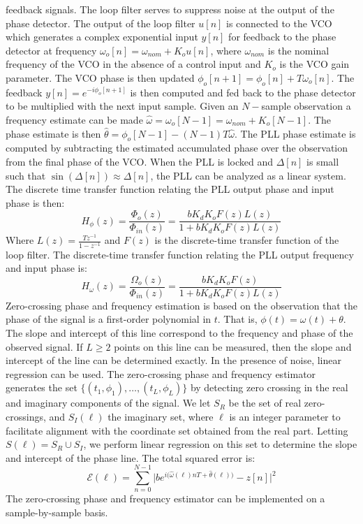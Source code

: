 \documentclass{article}
\theoremstyle{mystyle}
\begin{document}
feedback signals. The loop filter serves to suppress noise at the output of the phase detector. The output of the loop filter $u[n]$ is connected to the VCO which generates a complex exponential input $y[n]$ for feedback to the phase detector at frequency $\omega_{o}[n] = \omega_{nom}+K_{o}u[n]$, where $\omega_{nom}$ is the nominal frequency of the VCO in the absence of a control input and $K_{o}$ is the VCO gain parameter. The VCO phase is then updated $\phi_{o}[n+1] = \phi_{o}[n]+T\omega_{o}[n]$. The feedback $y[n] = e^{-i\phi_{o}[n+1]}$ is then computed and fed back to the phase detector to be multiplied with the next input sample. Given an $N-$sample observation a frequency estimate can be made $\hat{\omega} = \omega_{o}[N-1] = \omega_{nom}+K_{o}[N-1]$. The phase estimate is then $\hat{\theta}=\phi_{o}[N-1]-(N-1)T\hat{\omega}$. The PLL phase estimate is computed by subtracting the estimated accumulated phase over the observation from the final phase of the VCO. When the PLL is locked and $\Delta[n]$ is small such that $\sin(\Delta[n]) \approx \Delta[n]$, the PLL can be analyzed as a linear system. The discrete time transfer function relating the PLL output phase and input phase is then:
\begin{equation}
H_{\phi}(z) = \frac{\Phi_{o}(z)}{\Phi_{in}(z)} = \frac{bK_{d}K_{o}F(z)L(z)}{1+bK_{d}K_{o}F(z)L(z)}
\end{equation}
Where $L(z) = \frac{Tz^{-1}}{1-z^{-1}}$ and $F(z)$ is the discrete-time transfer function of the loop filter. The discrete-time transfer function relating the PLL output frequency and input phase is:
\begin{equation}
H_{\omega}(z) = \frac{\Omega_{o}(z)}{\Phi_{in}(z)} = \frac{bK_{d}K_{o}F(z)}{1+bK_{d}K_{o}F(z)L(z)}
\end{equation}
Zero-crossing phase and frequency estimation is based on the observation that the phase of the signal is a first-order polynomial in $t$. That is, $\phi(t) = \omega(t)+\theta$. The slope and intercept of this line correspond to the frequency and phase of the observed signal. If $L\geq 2$ points on this line can be measured, then the slope and intercept of the line can be determined exactly. In the presence of noise, linear regression can be used. The zero-crossing phase and frequency estimator generates the set $\{(t_1,\phi_1),\hdots, (t_{L},\phi_{L})\}$ by detecting zero crossing in the real and imaginary components of the signal. We let $S_{R}$ be the set of real zero-crossings, and $S_{I}(\ell)$ the imaginary set, where $\ell$ is an integer parameter to facilitate alignment with the coordinate set obtained from the real part. Letting $S(\ell) = S_{R}\cup S_{I}$, we perform linear regression on this set to determine the slope and intercept of the phase line. The total squared error is:
\begin{equation}
\mathcal{E}(\ell) = \sum_{n=0}^{N-1} \bigg|be^{i\big(\hat{\omega}(\ell)nT+\hat{\theta}(\ell)\big)}-z[n]\bigg|^2
\end{equation}
The zero-crossing phase and frequency estimator can be implemented on a sample-by-sample basis. 
\end{document}
